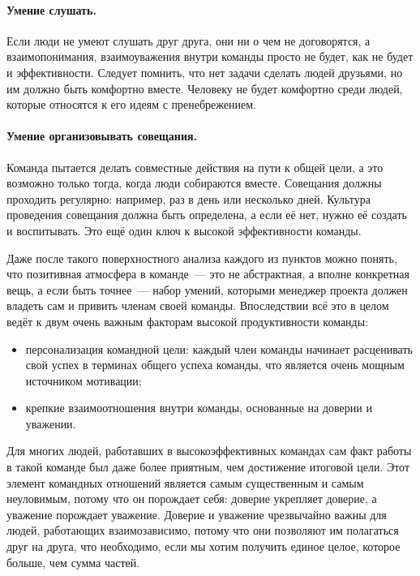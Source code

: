 \documentclass{../../text-style}
\begin{document}
\paragraph*{Умение слушать.} Если люди не умеют слушать друг друга, они ни о чем не договорятся, а взаимопонимания, взаимоуважения внутри команды просто не будет, как не будет и эффективности. Следует помнить, что нет задачи сделать людей друзьями, но им должно быть комфортно вместе. Человеку не будет комфортно среди людей, которые относятся к его идеям с пренебрежением.

\paragraph*{Умение организовывать совещания.} Команда пытается делать совместные действия на пути к общей цели, а это возможно только тогда, когда люди собираются вместе. Совещания должны проходить регулярно: например, раз в день или несколько дней. Культура проведения совещания должна быть определена, а если её нет, нужно её создать и воспитывать. Это ещё один ключ к высокой эффективности команды.

Даже после такого поверхностного анализа каждого из пунктов можно понять, что позитивная атмосфера в команде~--- это не абстрактная, а вполне конкретная вещь, а если быть точнее~--- набор умений, которыми менеджер проекта должен владеть сам и привить членам своей команды. Впоследствии всё это в целом ведёт к двум очень важным факторам высокой продуктивности команды:

\begin{itemize}
    \item персонализация командной цели: каждый член команды начинает расценивать свой успех в терминах общего успеха команды, что является очень мощным источником мотивации;
    \item крепкие взаимоотношения внутри команды, основанные на доверии и уважении. 
\end{itemize}

Для многих людей, работавших в высокоэффективных командах сам факт работы в такой команде был даже более приятным, чем достижение итоговой цели. Этот элемент командных отношений является самым существенным и самым неуловимым, потому что он порождает себя: доверие укрепляет доверие, а уважение порождает уважение. Доверие и уважение чрезвычайно важны для людей, работающих взаимозависимо, потому что они позволяют им полагаться друг на друга, что необходимо, если мы хотим получить единое целое, которое больше, чем сумма частей.
\end{document}
